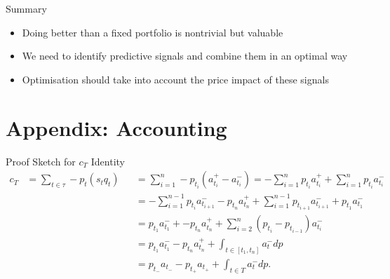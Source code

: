 \documentclass{beamer}
\begin{document}
\begin{frame}{Summary}
	\begin{itemize}
		\item Doing better than a fixed portfolio is nontrivial but valuable
		\item We need to identify predictive signals and combine them in an optimal way
		\item Optimisation should take into account the price impact of these signals
	\end{itemize}
\end{frame}




\section{Appendix: Accounting}
\begin{frame}{Proof Sketch for $c_T$ Identity}
	\begin{align*}
			c_{T}	&= \sum_{t\in\tau} - p_t (s_t q_t)	&&= \sum_{i=1}^n - p_{t_i} (a_{t_i}^+-a_{t_i}^-) = - \sum_{i=1}^n p_{t_i} a_{t_i}^+ + \sum_{i=1}^n p_{t_i} a_{t_i}^-
		\\		&					&&= - \sum_{i=1}^{n-1} p_{t_i} a_{t_{i+1}}^- - p_{t_n} a_{t_n}^+ + \sum_{i=1}^{n-1} p_{t_{i+1}} a_{t_{i+1}}^- + p_{t_1}a_{t_1}^-
		\\		&					&&= p_{t_1}a_{t_1}^- + - p_{t_n} a_{t_n}^+ + \sum_{i=2}^n (p_{t_i}-p_{t_{i-1}}) a_{t_i}^-
		\\		&					&&= p_{t_1}a_{t_1}^- - p_{t_n}a_{t_n}^+ + \int_{t\in[t_1,t_n]} a_t^- dp
		\\		&					&&= p_{t_-}a_{t_-} - p_{t_+}a_{t_+} + \int_{t\in T} a_t^- dp.
	\end{align*}
\end{frame}
\end{document}
